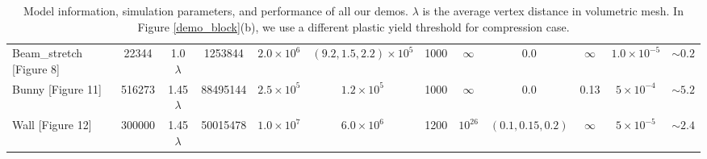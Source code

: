 \begin{table*}[htb]
{\begin{tabular}{lccccccccccc}
  Beam\_stretch [Figure 8] & 22344  & 1.0 $\lambda$ & 1253844  & $2.0\times10^6$   & $(9.2,1.5,2.2)\times10^5$& 1000 & $\infty$  & 0.0             &$\infty$  & $1.0\times10^{-5}$ & $\sim0.2$ \\
  Bunny [Figure 11]        & 516273 & 1.45$\lambda$ & 88495144 & $2.5\times10^5$   & $1.2\times10^5$          & 1000 & $\infty $ & 0.0             & 0.13     & $5\times10^{-4}$   & $\sim5.2$ \\
  Wall [Figure 12]         & 300000 & 1.45$\lambda$ & 50015478 & $1.0\times10^{7}$ & $6.0\times10^{6}$        & 1200 & $10^{26}$ &$(0.1,0.15,0.2)$ &$\infty$  & $5\times10^{-5}$   & $\sim2.4$ \\
  \hline
\end{tabular}
}
\label{table_parameters}
\caption{Model information, simulation parameters, and performance of all our demos. $\lambda$ is the average vertex distance in volumetric mesh. In Figure \ref{demo_block}(b), we use a different plastic yield threshold for compression case.}
\end{table*}
